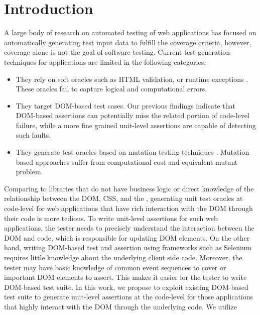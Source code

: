 \section{Introduction} \label{Sec:intro}
A large body of research on automated testing of \javascript web applications has focused on automatically generating test input data to fulfill the coverage criteria, however, coverage alone is not the goal of software testing.
Current test generation techniques for \javascript applications are limited in the following categories:
\begin{itemize}
\item They rely on soft oracles such as HTML validation, or runtime exceptions \cite{artzi:icse11}. These oracles fail to capture logical and computational errors. 
\item They target DOM-based test cases. Our previous findings \cite{mirshokraie:icst15} indicate that DOM-based assertions can potentially miss the related portion of
code-level failure, while a more fine grained unit-level assertions are capable of detecting such faults.
\item They generate test oracles based on mutation testing techniques \cite{mirshokraie:icst15, fraser:tse12}. Mutation-based approaches suffer from computational cost and equivalent mutant problem.
\end{itemize}
Comparing to \javascript libraries that do not have business logic or direct knowledge of the relationship between the DOM, CSS, and the \javascript, generating unit test oracles  
at \javascript code-level for web applications that have rich interaction with the DOM through their \javascript code is more tedious. To write unit-level assertions for such web applications, the tester needs to precisely understand the interaction between the DOM and \javascript code, which is responsible for updating DOM elements. On the other hand,
writing DOM-based test and assertion using frameworks such as Selenium
requires little knowledge about the underlying client side code. Moreover, the tester may have basic knowledge of common event sequences to cover or important DOM elements to assert. This makes it easier for the tester to write DOM-based test suite.
In this work, we propose to exploit existing DOM-based test suite to generate unit-level assertions at the \javascript code-level for those applications that highly interact with the DOM through the underlying \javascript code. We utilize
